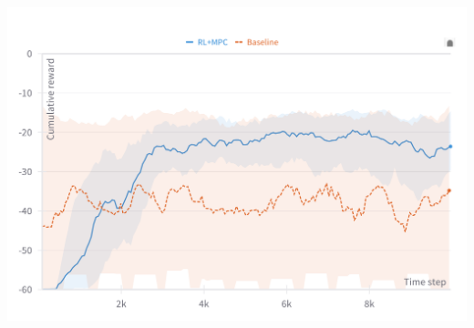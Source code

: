 \documentclass[
  letterpaper,
  DIV=11,
  numbers=noendperiod,
  oneside]{scrartcl}
\begin{document}
\begin{center}
\includegraphics{figs/reward-RL-baseline-badmodel.png}
\end{center}

\subsection{}\label{section-52}
\end{document}
